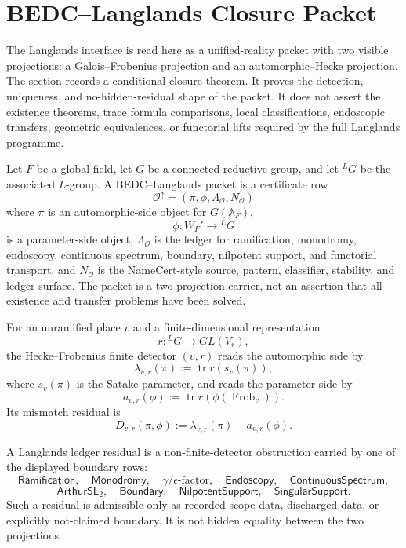 \section{BEDC--Langlands Closure Packet}
\label{sec:unified-reality-bedc-langlands-closure-packet}

The Langlands interface is read here as a unified-reality packet with
two visible projections: a Galois--Frobenius projection and an
automorphic--Hecke projection. The section records a conditional closure
theorem. It proves the detection, uniqueness, and no-hidden-residual
shape of the packet. It does not assert the existence theorems, trace
formula comparisons, local classifications, endoscopic transfers,
geometric equivalences, or functorial lifts required by the full
Langlands programme.

\begin{definition}
\label{def:unified-reality-bedc-langlands-packet}
Let $F$ be a global field, let $G$ be a connected reductive group, and
let ${}^LG$ be the associated $L$-group. A BEDC--Langlands packet is a
certificate row
$$
\mathcal O^{\uparrow}
=
(\pi,\phi,\Lambda_{\mathcal O},N_{\mathcal O})
$$
where $\pi$ is an automorphic-side object for $G(\mathbb A_F)$,
$$
\phi:W_F'\longrightarrow{}^LG
$$
is a parameter-side object, $\Lambda_{\mathcal O}$ is the ledger for
ramification, monodromy, endoscopy, continuous spectrum, boundary,
nilpotent support, and functorial transport, and $N_{\mathcal O}$ is the
NameCert-style source, pattern, classifier, stability, and ledger
surface. The packet is a two-projection carrier, not an assertion that
all existence and transfer problems have been solved.
\end{definition}

\begin{definition}
\label{def:unified-reality-hecke-frobenius-finite-detector}
For an unramified place $v$ and a finite-dimensional representation
$$
r:{}^LG\longrightarrow GL(V_r),
$$
the Hecke--Frobenius finite detector $(v,r)$ reads the automorphic side
by
$$
\lambda_{v,r}(\pi):=\operatorname{tr} r(s_v(\pi)),
$$
where $s_v(\pi)$ is the Satake parameter, and reads the parameter side by
$$
a_{v,r}(\phi):=
\operatorname{tr}r(\phi(\operatorname{Frob}_v)).
$$
Its mismatch residual is
$$
D_{v,r}(\pi,\phi):=\lambda_{v,r}(\pi)-a_{v,r}(\phi).
$$
\end{definition}

\begin{definition}
\label{def:unified-reality-langlands-ledger-residual}
A Langlands ledger residual is a non-finite-detector obstruction carried
by one of the displayed boundary rows:
$$
\mathsf{Ramification},\quad
\mathsf{Monodromy},\quad
\gamma/\epsilon\text{-factor},\quad
\mathsf{Endoscopy},\quad
\mathsf{ContinuousSpectrum},
$$
$$
\mathsf{ArthurSL}_2,\quad
\mathsf{Boundary},\quad
\mathsf{NilpotentSupport},\quad
\mathsf{SingularSupport}.
$$
Such a residual is admissible only as recorded scope data, discharged
data, or explicitly not-claimed boundary. It is not hidden equality
between the two projections.
\end{definition}


